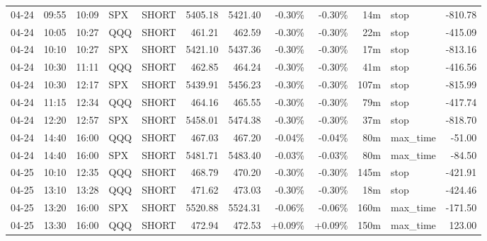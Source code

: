 \documentclass[11pt,a4paper]{article}
\begin{document}
\begin{center}
\begin{longtable}{>{\color{txtmain}}l l l l l r r r r r >{\color{txtmain}}l r}
04-24 & 09:55 & 10:09 & SPX & SHORT & 5405.18 & 5421.40 & \textcolor{lossred}{-0.30\%} & \textcolor{lossred}{-0.30\%} & 14m & stop & \textcolor{lossred}{-810.78} \\
04-24 & 10:05 & 10:27 & QQQ & SHORT & 461.21 & 462.59 & \textcolor{lossred}{-0.30\%} & \textcolor{lossred}{-0.30\%} & 22m & stop & \textcolor{lossred}{-415.09} \\
04-24 & 10:10 & 10:27 & SPX & SHORT & 5421.10 & 5437.36 & \textcolor{lossred}{-0.30\%} & \textcolor{lossred}{-0.30\%} & 17m & stop & \textcolor{lossred}{-813.16} \\
04-24 & 10:30 & 11:11 & QQQ & SHORT & 462.85 & 464.24 & \textcolor{lossred}{-0.30\%} & \textcolor{lossred}{-0.30\%} & 41m & stop & \textcolor{lossred}{-416.56} \\
04-24 & 10:30 & 12:17 & SPX & SHORT & 5439.91 & 5456.23 & \textcolor{lossred}{-0.30\%} & \textcolor{lossred}{-0.30\%} & 107m & stop & \textcolor{lossred}{-815.99} \\
04-24 & 11:15 & 12:34 & QQQ & SHORT & 464.16 & 465.55 & \textcolor{lossred}{-0.30\%} & \textcolor{lossred}{-0.30\%} & 79m & stop & \textcolor{lossred}{-417.74} \\
04-24 & 12:20 & 12:57 & SPX & SHORT & 5458.01 & 5474.38 & \textcolor{lossred}{-0.30\%} & \textcolor{lossred}{-0.30\%} & 37m & stop & \textcolor{lossred}{-818.70} \\
04-24 & 14:40 & 16:00 & QQQ & SHORT & 467.03 & 467.20 & \textcolor{lossred}{-0.04\%} & \textcolor{lossred}{-0.04\%} & 80m & max\_time & \textcolor{lossred}{-51.00} \\
04-24 & 14:40 & 16:00 & SPX & SHORT & 5481.71 & 5483.40 & \textcolor{lossred}{-0.03\%} & \textcolor{lossred}{-0.03\%} & 80m & max\_time & \textcolor{lossred}{-84.50} \\
04-25 & 10:10 & 12:35 & QQQ & SHORT & 468.79 & 470.20 & \textcolor{lossred}{-0.30\%} & \textcolor{lossred}{-0.30\%} & 145m & stop & \textcolor{lossred}{-421.91} \\
04-25 & 13:10 & 13:28 & QQQ & SHORT & 471.62 & 473.03 & \textcolor{lossred}{-0.30\%} & \textcolor{lossred}{-0.30\%} & 18m & stop & \textcolor{lossred}{-424.46} \\
04-25 & 13:20 & 16:00 & SPX & SHORT & 5520.88 & 5524.31 & \textcolor{lossred}{-0.06\%} & \textcolor{lossred}{-0.06\%} & 160m & max\_time & \textcolor{lossred}{-171.50} \\
04-25 & 13:30 & 16:00 & QQQ & SHORT & 472.94 & 472.53 & \textcolor{wingreen}{+0.09\%} & \textcolor{wingreen}{+0.09\%} & 150m & max\_time & \textcolor{wingreen}{123.00} \\

\end{longtable}
\end{center}
\end{document}
